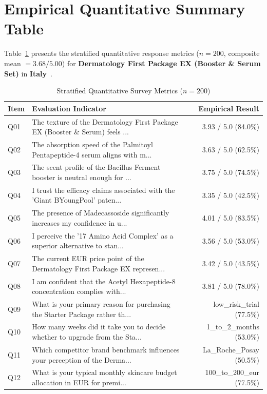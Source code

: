 \documentclass[10pt,twocolumn,a4paper]{article}
\begin{document}
\section{Empirical Quantitative Summary Table}
Table~\ref{tab:metrics} presents the stratified quantitative response metrics ($n = 200$, composite mean $= 3.68/5.00$) for \textbf{Dermatology First Package EX (Booster \& Serum Set)} in \textbf{Italy}~\cite{ref_kaggle_doi,ref_hf_doi}.

\begin{table}[t]
\centering
\caption{Stratified Quantitative Survey Metrics ($n = 200$)}
\label{tab:metrics}
\small
\begin{tabularx}{\textwidth}{l X r}
\toprule
\textbf{Item} & \textbf{Evaluation Indicator} & \textbf{Empirical Result} \\
\midrule
Q01 & The texture of the Dermatology First Package EX (Booster \& Serum) feels ... & 3.93 / 5.0 (84.0\%) \\
Q02 & The absorption speed of the Palmitoyl Pentapeptide-4 serum aligns with m... & 3.63 / 5.0 (62.5\%) \\
Q03 & The scent profile of the Bacillus Ferment booster is neutral enough for ... & 3.75 / 5.0 (74.5\%) \\
Q04 & I trust the efficacy claims associated with the 'Giant BYoungPool' paten... & 3.35 / 5.0 (42.5\%) \\
Q05 & The presence of Madecassoside significantly increases my confidence in u... & 4.01 / 5.0 (83.5\%) \\
Q06 & I perceive the '17 Amino Acid Complex' as a superior alternative to stan... & 3.56 / 5.0 (53.0\%) \\
Q07 & The current EUR price point of the Dermatology First Package EX represen... & 3.42 / 5.0 (43.5\%) \\
Q08 & I am confident that the Acetyl Hexapeptide-8 concentration complies with... & 3.81 / 5.0 (78.0\%) \\
Q09 & What is your primary reason for purchasing the Starter Package rather th... & low\_risk\_trial (77.5\%) \\
Q10 & How many weeks did it take you to decide whether to upgrade from the Sta... & 1\_to\_2\_months (53.0\%) \\
Q11 & Which competitor brand benchmark influences your perception of the Derma... & La\_Roche\_Posay (50.5\%) \\
Q12 & What is your typical monthly skincare budget allocation in EUR for premi... & 100\_to\_200\_eur (77.5\%) \\

\end{tabularx}
\end{table}
\end{document}
